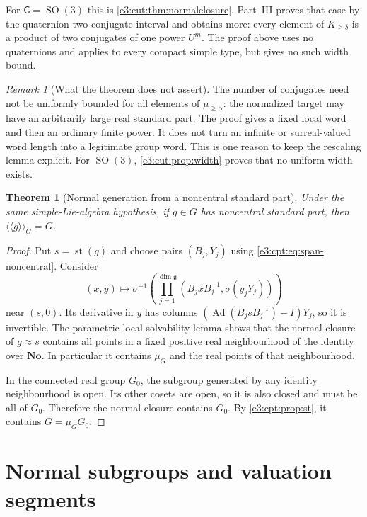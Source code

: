 \documentclass[11pt,letterpaper]{article}
\numberwithin{equation}{section}
\newtheorem{theorem}{Theorem}[section]
\theoremstyle{definition}
\theoremstyle{remark}
\newtheorem{remark}[remark]{Remark}
\newcommand{\No}{\mathbf{No}}
\newcommand{\st}{\operatorname{st}}
\newcommand{\SO}{\operatorname{SO}}
\newcommand{\Ad}{\operatorname{Ad}}
\newcommand{\comm}[2]{\left(#1,#2\right)}
\newcommand{\nc}[1]{\langle\!\langle #1\rangle\!\rangle}
\newcommand{\sG}{\mathsf G}
\begin{document}
For $\sG=\SO(3)$ this is \cref{e3:cut:thm:normalclosure}. Part~III proves that
case by the quaternion two-conjugate interval and obtains more: every element
of $K_{\ge\delta}$ is a product of two conjugates of one power $U^m$. The proof
above uses no quaternions and applies to every compact simple type, but gives no
such width bound.

\begin{remark}[What the theorem does not assert]\label{e3:cpt:rem:nowidth}
The number of conjugates need not be uniformly bounded for all elements of
$\mu_{\ge\alpha}$: the normalized target may have an arbitrarily large real
standard part. The proof gives a fixed local word and then an ordinary finite
power. It does not turn an infinite or surreal-valued word length into a
legitimate group word. This is one reason to keep the rescaling lemma explicit.
For $\SO(3)$, \cref{e3:cut:prop:width} proves that no uniform width exists.
\end{remark}

\begin{theorem}[Normal generation from a noncentral standard part]\label{e3:cpt:thm:noncentral}
Under the same simple-Lie-algebra hypothesis, if $g\in G$ has noncentral
standard part, then $\nc{g}_G=G$.
\end{theorem}
\begin{proof}
Put $s=\st(g)$ and choose pairs $(B_j,Y_j)$ using
\cref{e3:cpt:eq:span-noncentral}. Consider
\[
 (x,y)\longmapsto
 \sigma^{-1}\!\left(\prod_{j=1}^{\dim\mathfrak g}
 \comm{B_jxB_j^{-1}}{\sigma(y_jY_j)}\right)
\]
near $(s,0)$. Its derivative in $y$ has columns $(\Ad(B_jsB_j^{-1})-I)Y_j$, so
it is invertible. The parametric local solvability lemma shows that the normal
closure of $g\approx s$ contains all points in a fixed positive real
neighbourhood of the identity over $\No$. In particular it contains $\mu_G$ and
the real points of that neighbourhood.

In the connected real group $G_0$, the subgroup generated by any identity
neighbourhood is open. Its other cosets are open, so it is also closed and must
be all of $G_0$. Therefore the normal closure contains $G_0$. By
\cref{e3:cpt:prop:st}, it contains $G=\mu_GG_0$.
\end{proof}

\section{Normal subgroups and valuation segments}\label{e3:cpt:sec:cuts}
\end{document}
